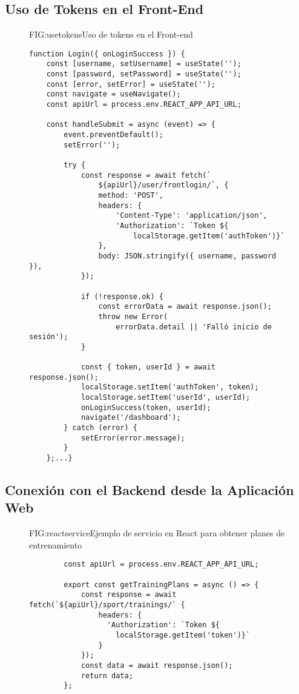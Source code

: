 \subsection{Uso de Tokens en el Front-End}
\begin{figure}[Uso de Tokens]{FIG:usetokens}{Uso de tokens en el Front-end}
\begin{verbatim}
function Login({ onLoginSuccess }) {
    const [username, setUsername] = useState('');
    const [password, setPassword] = useState('');
    const [error, setError] = useState('');
    const navigate = useNavigate();
    const apiUrl = process.env.REACT_APP_API_URL;

    const handleSubmit = async (event) => {
        event.preventDefault();
        setError('');

        try {
            const response = await fetch(`
                ${apiUrl}/user/frontlogin/`, {
                method: 'POST',
                headers: {
                    'Content-Type': 'application/json',
                    'Authorization': `Token ${
                        localStorage.getItem('authToken')}`
                },
                body: JSON.stringify({ username, password }),
            });

            if (!response.ok) {
                const errorData = await response.json();
                throw new Error(
                    errorData.detail || 'Falló inicio de sesión');
            }

            const { token, userId } = await response.json();
            localStorage.setItem('authToken', token);
            localStorage.setItem('userId', userId);
            onLoginSuccess(token, userId);
            navigate('/dashboard');
        } catch (error) {
            setError(error.message);
        }
    };...}
\end{verbatim}
\end{figure}

\newpage

\subsection{Conexión con el Backend desde la Aplicación Web}
\begin{figure}[Ejemplo Servicio React]{FIG:reactservice}{Ejemplo de servicio en React para obtener planes de entrenamiento}
    \begin{verbatim}
        const apiUrl = process.env.REACT_APP_API_URL;

        export const getTrainingPlans = async () => {
            const response = await fetch(`${apiUrl}/sport/trainings/` {
                headers: {
                  'Authorization': `Token ${
                    localStorage.getItem('token')}`
                }
            });
            const data = await response.json();
            return data;
        };
    \end{verbatim}
    \end{figure}

